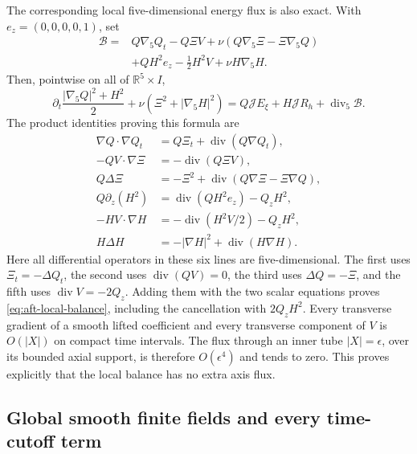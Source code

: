 The corresponding local five-dimensional energy flux is also exact.
With \(e_z=(0,0,0,0,1)\), set
\begin{equation}\label{eq:aft-local-flux}
 \begin{split}
 \mathcal B={}&Q\nabla_5Q_t-Q\Xi V
       +\nu(Q\nabla_5\Xi-\Xi\nabla_5Q)\\
       &+QH^2e_z-\tfrac12H^2V+\nu H\nabla_5H.
 \end{split}
\end{equation}
Then, pointwise on all of \(\mathbb R^5\times I\),
\begin{equation}\label{eq:aft-local-balance}
 \partial_t\frac{|\nabla_5Q|^2+H^2}{2}
 +\nu(\Xi^2+|\nabla_5H|^2)
 =Q\mathcal J E_\xi+H\mathcal J R_h+\operatorname{div}_5\mathcal B.
\end{equation}
The product identities proving this formula are
\begin{align*}
 \nabla Q\cdot\nabla Q_t
   &=Q\Xi_t+\operatorname{div}(Q\nabla Q_t),\\
 -QV\cdot\nabla\Xi&=-\operatorname{div}(Q\Xi V),\\
 Q\Delta\Xi&=-\Xi^2+\operatorname{div}(Q\nabla\Xi-\Xi\nabla Q),\\
 Q\partial_z(H^2)&=\operatorname{div}(QH^2e_z)-Q_zH^2,\\
 -HV\cdot\nabla H&=-\operatorname{div}(H^2V/2)-Q_zH^2,\\
 H\Delta H&=-|\nabla H|^2+\operatorname{div}(H\nabla H).
\end{align*}
Here all differential operators in these six lines are five-dimensional.
The first uses \(\Xi_t=-\Delta Q_t\), the second uses
\(\operatorname{div}(QV)=0\), the third uses \(\Delta Q=-\Xi\),
and the fifth uses \(\operatorname{div}V=-2Q_z\).
Adding them with the two scalar equations proves
\eqref{eq:aft-local-balance}, including the cancellation with \(2Q_zH^2\).
Every transverse gradient of a smooth lifted coefficient and every
transverse component of \(V\) is \(O(|X|)\) on compact time intervals.
The flux through an inner tube \(|X|=\epsilon\), over its bounded
axial support, is therefore \(O(\epsilon^4)\) and tends to zero.
This proves explicitly that the local balance has no extra axis flux.

\subsection{Global smooth finite fields and every time-cutoff term}

